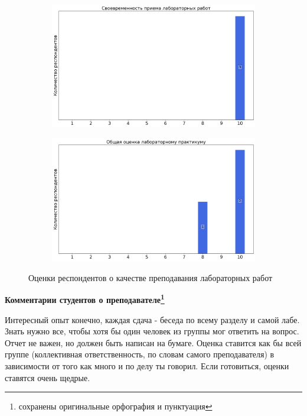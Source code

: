 \begin{figure}[H]
\begin{subfigure}[b]{0.45\textwidth}
                    \centering
                    \includegraphics[width=\textwidth]{images/3 course/Общая физика - квантовая физика/labniks-marks-Колдунов М.Ф.-2.png}
                \end{subfigure}
                \begin{subfigure}[b]{0.45\textwidth}
                    \centering
                    \includegraphics[width=\textwidth]{images/3 course/Общая физика - квантовая физика/labniks-marks-Колдунов М.Ф.-3.png}
                \end{subfigure}	
                \caption{Оценки респондентов о качестве преподавания лабораторных работ}
            \end{figure}

            \textbf{Комментарии студентов о преподавателе\protect\footnote{сохранены оригинальные орфография и пунктуация}}
                \begin{commentbox} 
                    Интересный опыт конечно, каждая сдача - беседа по всему разделу и самой лабе. Знать нужно все, чтобы хотя бы один человек из группы мог ответить на вопрос. Отчет не важен, но должен быть написан на бумаге. Оценка ставится как бы всей группе (коллективная ответственность, по словам самого преподавателя) в зависимости от того как много и по делу ты говорил. Если готовиться, оценки ставятся очень щедрые. 
                \end{commentbox}

